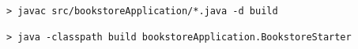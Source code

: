 \begin{lstlisting}[caption=Compile and run under Linux]
> javac src/bookstoreApplication/*.java -d build

> java -classpath build bookstoreApplication.BookstoreStarter 
\end{lstlisting}
